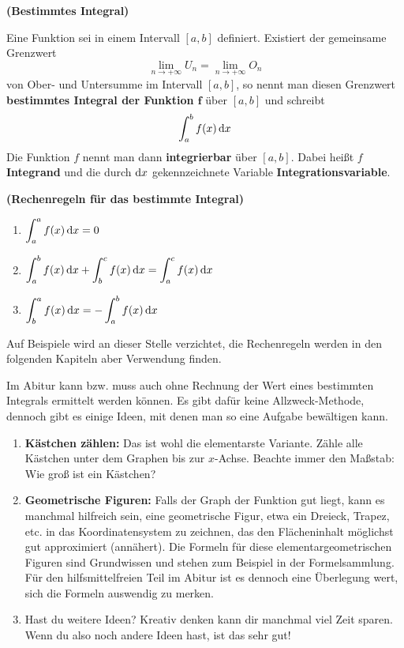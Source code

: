 \documentclass[ngerman, 12pt]{nssheetxea}
\begin{document}
\begin{definition} \textbf{(Bestimmtes Integral)} \par
Eine Funktion sei in einem Intervall $[a,b]$ definiert. Existiert der gemeinsame Grenzwert 
\[ \lim_{n\rightarrow +\infty} U_n = \lim_{n\rightarrow +\infty} O_n\] 
von Ober- und Untersumme im Intervall $[a,b]$, so nennt man diesen Grenzwert \textbf{bestimmtes Integral der Funktion $\mathbf{f}$} über $[a,b]$ und schreibt 
\[ \int_a^b f(x) \mathop{}\!\mathrm{d} x  \]
Die Funktion $f$ nennt man dann \textbf{integrierbar} über $[a,b]$. Dabei heißt $f$ \textbf{Integrand} und die durch $\mathop{}\!\mathrm{d} x$ gekennzeichnete Variable \textbf{Integrationsvariable}.
\end{definition}

\begin{theorem} \textbf{(Rechenregeln für das bestimmte Integral)} \par
\begin{enumerate}
\item $ \displaystyle \int_a^a f(x) \mathop{}\!\mathrm{d} x = 0 $  
\item $\displaystyle \int_a^b f(x) \mathop{}\!\mathrm{d} x + \int_b^c f(x) \mathop{}\!\mathrm{d} x= \int_a^c f(x) \mathop{}\!\mathrm{d} x $
\item $\displaystyle \int_b^a f(x) \mathop{}\!\mathrm{d} x = -\int_a^b f(x) \mathop{}\!\mathrm{d} x$
\end{enumerate}
\label{Satz:Rechenregeln_besIntegral}
\end{theorem}
Auf Beispiele wird an dieser Stelle verzichtet, die Rechenregeln werden in den folgenden Kapiteln aber Verwendung finden. \par
Im Abitur kann bzw. muss auch ohne Rechnung der Wert eines bestimmten Integrals ermittelt werden können. Es gibt dafür keine Allzweck-Methode, dennoch gibt es einige Ideen, mit denen man so eine Aufgabe bewältigen kann. 
\begin{enumerate}
\item \textbf{Kästchen zählen:} Das ist wohl die elementarste Variante. Zähle alle Kästchen unter dem Graphen bis zur $x$-Achse. Beachte immer den Maßstab: Wie groß ist ein Kästchen?
\item  \textbf{Geometrische Figuren:} Falls der Graph der Funktion gut liegt, kann es manchmal hilfreich sein, eine geometrische Figur, etwa ein Dreieck, Trapez, etc. in das Koordinatensystem zu zeichnen, das den Flächeninhalt möglichst gut approximiert (annähert). Die Formeln für diese elementargeometrischen Figuren sind Grundwissen und stehen zum Beispiel in der Formelsammlung. Für den hilfsmittelfreien Teil im Abitur ist es dennoch eine Überlegung wert, sich die Formeln auswendig zu merken.
\item Hast du weitere Ideen? Kreativ denken kann dir manchmal viel Zeit sparen. Wenn du also noch andere Ideen hast, ist das sehr gut!
\end{enumerate}
\end{document}
